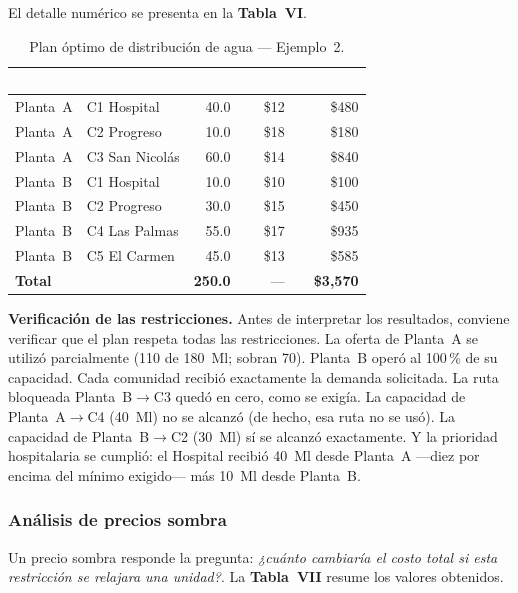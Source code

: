 \documentclass[10pt,letterpaper,twocolumn]{article}
\begin{document}
El detalle numérico se presenta en la \textbf{Tabla~VI}.

\begin{table}[!h]
\caption{Plan óptimo de distribución de agua --- Ejemplo~2.}
\centering
\fontsize{7.5pt}{9pt}\selectfont
\begin{tabular}{l l r r r}
\arrayrulecolor{infotec}\toprule
\rowcolor{infotec}\textcolor{white}{\textbf{Origen}} & \textcolor{white}{\textbf{Destino}} & \textcolor{white}{\textbf{Flujo}} & \textcolor{white}{\textbf{Costo}} & \textcolor{white}{\textbf{Subtotal}} \\
\midrule
Planta~A & C1 Hospital     & 40.0 & \$12 & \$480 \\
Planta~A & C2 Progreso     & 10.0 & \$18 & \$180 \\
Planta~A & C3 San Nicolás  & 60.0 & \$14 & \$840 \\
Planta~B & C1 Hospital     & 10.0 & \$10 & \$100 \\
Planta~B & C2 Progreso     & 30.0 & \$15 & \$450 \\
Planta~B & C4 Las Palmas   & 55.0 & \$17 & \$935 \\
Planta~B & C5 El Carmen    & 45.0 & \$13 & \$585 \\
\midrule
\multicolumn{2}{l}{\textbf{Total}} & \textbf{250.0} & --- & \textbf{\$3{,}570} \\
\bottomrule
\end{tabular}
\end{table}

\textbf{Verificación de las restricciones.} Antes de interpretar los resultados, conviene verificar que el plan respeta todas las restricciones. La oferta de Planta~A se utilizó parcialmente (110 de 180~Ml; sobran 70). Planta~B operó al 100\,\% de su capacidad. Cada comunidad recibió exactamente la demanda solicitada. La ruta bloqueada Planta~B$\to$C3 quedó en cero, como se exigía. La capacidad de Planta~A$\to$C4 (40~Ml) no se alcanzó (de hecho, esa ruta no se usó). La capacidad de Planta~B$\to$C2 (30~Ml) sí se alcanzó exactamente. Y la prioridad hospitalaria se cumplió: el Hospital recibió 40~Ml desde Planta~A ---diez por encima del mínimo exigido--- más 10~Ml desde Planta~B.

\subsubsection{Análisis de precios sombra}
Un precio sombra responde la pregunta: \emph{¿cuánto cambiaría el costo total si esta restricción se relajara una unidad?}. La \textbf{Tabla~VII} resume los valores obtenidos.
\end{document}
